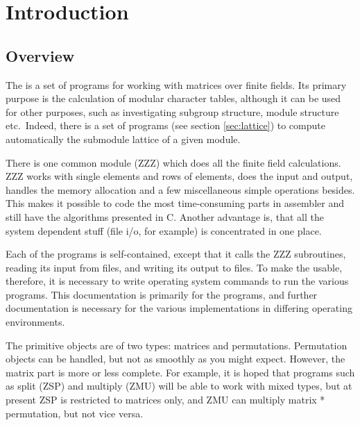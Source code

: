 
\chapter{Introduction}

\section{Overview}
The {\MeatAxe} is a set of programs for working with matrices over
finite fields. Its primary purpose is the calculation of modular
character tables, although it can be used for other purposes, such
as investigating subgroup structure, module structure etc.\ Indeed,
there is a set of programs (see section \ref{sec:lattice}) to
compute automatically the submodule lattice of a given module.

There is one common module (ZZZ) which does all the finite field
calculations. ZZZ works with single elements and rows of elements,
does the input and output, handles the memory allocation and a few
miscellaneous simple operations besides. This makes it possible to
code the most time-consuming parts in assembler and still have the
algorithms presented in C. Another advantage is, that all the
system dependent stuff (file i/o, for example) is concentrated in
one place.

Each of the programs is self-contained, except that it calls the ZZZ
subroutines, reading its input from files, and writing its output to
files. To make the {\MeatAxe} usable, therefore, it is necessary to
write operating system commands to run the various programs. This
documentation is primarily for the programs, and further documentation
is necessary for the various implementations in differing operating
environments.

The primitive objects are of two types: matrices and permutations.
Permutation objects can be handled, but not as smoothly as you might
expect. However, the matrix part is more or less complete. For example,
it is hoped that programs such as split (ZSP) and multiply (ZMU) will
be able to work with mixed types, but at
present ZSP is restricted to matrices only, and ZMU can multiply
matrix * permutation, but not vice versa.


